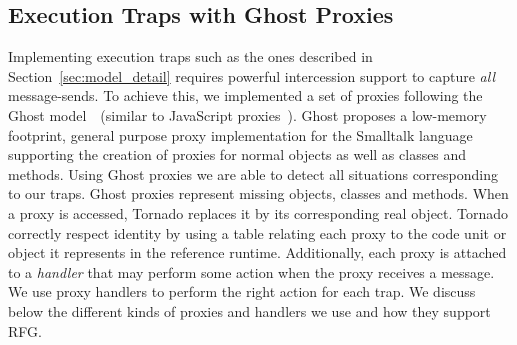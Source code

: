 \subsection{Execution Traps with Ghost Proxies} \label{sec:proxies}

Implementing execution traps such as the ones described in Section~\ref{sec:model_detail} requires powerful intercession support to capture \emph{all} message-sends.%
To achieve this, we implemented a set of proxies following the Ghost model~\cite{Mart14z}~(similar to JavaScript proxies~\cite{Vanc10a}). Ghost proposes a low-memory footprint, general purpose proxy implementation for the Smalltalk language supporting the creation of proxies for normal objects as well as classes and methods. 
Using Ghost proxies we are able to detect all situations corresponding to our traps.
Ghost proxies represent missing objects, classes and methods. When a proxy is accessed, Tornado replaces it by its corresponding real object.
Tornado correctly respect identity by using a table relating each proxy to the code unit or object it represents in the reference runtime.
Additionally, each proxy is attached to a \emph{handler} that may perform some action when the proxy receives a message.
We use proxy handlers to perform the right action for each trap.
We discuss below the different kinds of proxies and handlers we use and how they support RFG.

